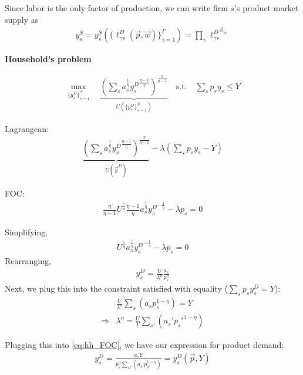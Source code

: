\documentclass[12pt]{article}
\def\g{\gamma}
\theoremstyle{definition}
\theoremstyle{plain}
\begin{document}
Since labor is the only factor of production, we can write firm $s$'s product market supply as 
\begin{align}
y_s^S = y_s^S\left( \{\ell_{\g s}^D (\vec{p}, \vec{w}) \}_{\g=1}^{\Gamma} \right) = \prod_{\g} {\ell_{\g s}^D}^{\beta_{\g s}} \label{eq:product_supply}
\end{align}


\textbf{Household's problem}

\begin{align*}
\max_{\{y_s^D\}_{s=1}^S} \quad \underset{U(\{y_s^D\}_{s=1}^S)}{\underbrace{ \left(\sum_s a_s^{\frac{1}{\eta}} {y_s^D}^{\frac{\eta-1}{\eta}}\right)^{\frac{\eta}{\eta-1}} }} \quad \text{s.t.} \quad \sum_s p_s y_s \leq Y
\end{align*}


Lagrangean:
\begin{align*}
\underset{U(\vec{y}^D)}{\underbrace{ \left(\sum_s a_s^{\frac{1}{\eta}} {y_s^D}^{\frac{\eta-1}{\eta}}\right)^{\frac{\eta}{\eta-1}} }} - \lambda \left(  \sum_s p_s y_s - Y \right)
\end{align*} 

FOC:
\begin{align*}
\frac{\eta}{\eta-1} U^{\frac{1}{\eta}} \frac{\eta-1}{\eta} a_s^{\frac{1}{\eta}} {y_s^D}^{-\frac{1}{\eta}} - \lambda p_s = 0
\end{align*}

Simplifying, 
\begin{align*}
U^{\frac{1}{\eta}} a_s^{\frac{1}{\eta}}  {y_s^D}^{-\frac{1}{\eta}} - \lambda p_s = 0
\end{align*}
Rearranging, 
\begin{align}
y_s^D = \frac{U}{\lambda^{\eta}} \frac{a_s}{p_s^{\eta}} \label{eq:hh_FOC}
\end{align}
Next, we plug this into the constraint satisfied with equality ($\sum_s p_s y_s^D = Y $):
\begin{align*}
&\frac{U}{\lambda^{\eta}} \sum_s \left( a_s p_s^{1-\eta} \right) = Y \\
\Rightarrow & \lambda^{\eta} = \frac{U}{Y} \sum_{s'} \left( a_s' p_s'^{1-\eta} \right)
\end{align*}

Plugging this into \ref{eq:hh_FOC}, we have our expression for product demand:
\begin{align}
y_s^D = \frac{ a_s Y}{p_s^{\eta} \sum_{s'} \left(a_{s'} p_{s'}^{1-\eta}\right)} = y_s^D(\vec{p},Y) \label{eq:product_demand}
\end{align}
\end{document}
